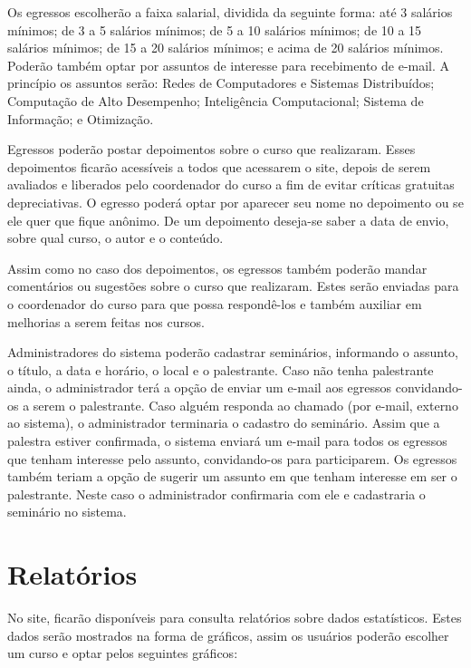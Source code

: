Os egressos escolherão a faixa salarial, dividida da seguinte forma: até 3 salários mínimos; de 3 a 5 salários mínimos; de 5 a 10 salários mínimos;  de 10 a 15 salários mínimos; de 15 a 20 salários mínimos; e acima de 20 salários mínimos. Poderão também optar por assuntos de interesse para recebimento de e-mail. A princípio os assuntos serão: Redes de Computadores e Sistemas Distribuídos; Computação de Alto Desempenho; Inteligência Computacional; Sistema de Informação; e Otimização. 

Egressos poderão postar depoimentos sobre o curso que realizaram. Esses depoimentos ficarão acessíveis a todos que acessarem o site, depois de serem avaliados e liberados pelo coordenador do curso a fim de evitar críticas gratuitas depreciativas. O egresso poderá optar por aparecer seu nome no depoimento ou se ele quer que fique anônimo. De um depoimento deseja-se saber a data de envio, sobre qual curso, o autor e o conteúdo. 

Assim como no caso dos depoimentos, os egressos também poderão mandar comentários ou sugestões sobre o curso que realizaram. Estes serão enviadas para o coordenador do curso para que possa respondê-los e também auxiliar em melhorias a serem feitas nos cursos. 

Administradores do sistema poderão cadastrar seminários, informando o assunto, o título, a data e horário, o local e o palestrante. Caso não tenha palestrante ainda, o administrador terá a opção de enviar um e-mail aos egressos convidando-os a serem o palestrante. Caso alguém responda ao chamado (por e-mail, externo ao sistema), o administrador terminaria o cadastro do seminário. Assim que a palestra estiver confirmada, o sistema enviará um e-mail para todos os egressos que tenham interesse pelo assunto, convidando-os para participarem. Os egressos também teriam a opção de sugerir um assunto em que tenham interesse em ser o palestrante. Neste caso o administrador confirmaria com ele e cadastraria o seminário no sistema.


\section{Relatórios}
\label{sec-minimundo:relatorio}

\noindent No site, ficarão disponíveis para consulta relatórios sobre dados estatísticos. Estes dados serão mostrados na forma de gráficos, assim os usuários poderão escolher um curso e optar pelos seguintes gráficos: 

